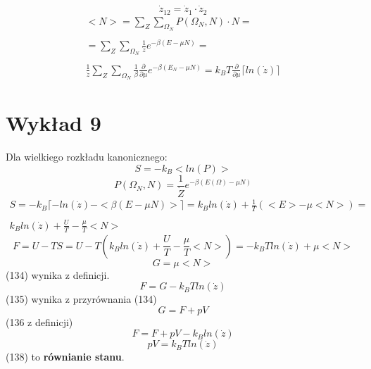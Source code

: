 \documentclass{article}
\begin{document}
		\begin{equation}
		\dot{z}_{12} = \dot{z}_1 \cdot \dot{z}_2
		\end{equation}
		\begin{equation}
		\begin{array}{cc}
		<N> = \sum_{Z}^{}\sum_{\Omega_N}P(\Omega_N, N) \cdot N = \\ \\
		 = \sum_{Z}^{}\sum_{\Omega_N}\frac{1}{\dot{z}}e^{-\beta (E - \mu N)} = \\ \\
		 \frac{1}{\dot{z}} \sum_{Z}^{}\sum_{\Omega_N} \frac{1}{\beta}\frac{\partial}{\partial \mu} 
		 e^{-\beta (E_N - \mu N)} = k_BT\frac{\partial}{\partial \mu}\lceil ln(\dot{z})\rceil
		\end{array}
		\end{equation}
	\section{Wykład 9}
		Dla wielkiego rozkładu kanonicznego:
		\begin{equation}
		S = -k_B<ln(P)>
		\end{equation}
		\begin{equation}
		P(\Omega_N, N) = \frac{1}{\dot{Z}}e^{-\beta(E(\Omega) - \mu N)}
		\end{equation}
		\begin{equation}
		\begin{array}{cc}
			S = -k_B \lceil - ln(\dot{z}) - <\beta(E - \mu N)> \rceil = 
			k_Bln(\dot{z}) + \frac{1}{T}(<E> - \mu<N>) = \\ \\
			k_Bln(\dot{z}) + \frac{U}{T} - \frac{\mu}{T}<N>
		\end{array}
		\end{equation}
		\begin{equation}
		F = U - TS = U - T(k_Bln(\dot{z}) + \frac{U}{T} - \frac{\mu}{T}<N>) = -k_BTln(\dot{z}) + \mu <N>
		\end{equation}
		\begin{equation}
		G = \mu <N>
		\end{equation}
		(134) wynika z definicji.
		\begin{equation}
		F = G - k_BTln(\dot{z})
		\end{equation}
		(135) wynika z przyrównania (134)
		\begin{equation}
		G = F + pV
		\end{equation}
		(136 z definicji)
		\begin{equation}
		F = F + pV - k_Bln(\dot{z})
		\end{equation}
		\begin{equation}
		pV = k_BTln(\dot{z})
		\end{equation}
		(138) to \textbf{równianie stanu}.
\end{document}

